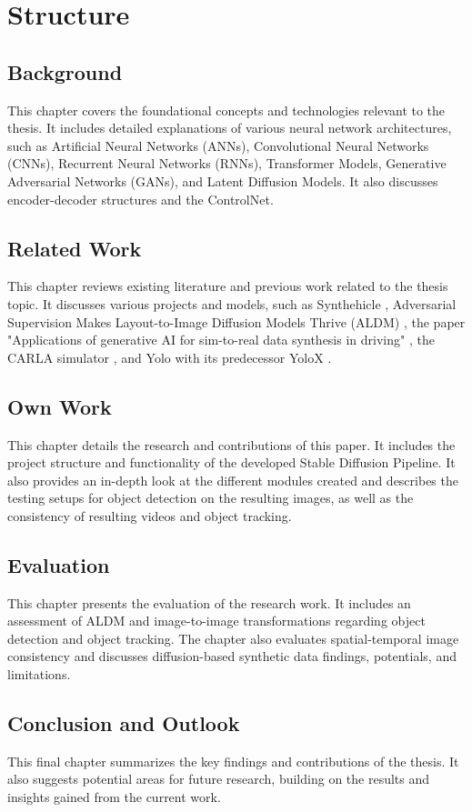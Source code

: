 \section{Structure}

\subsection{Background}
This chapter covers the foundational concepts and technologies relevant to the thesis. It includes detailed explanations of various neural network architectures, such as Artificial Neural Networks (ANNs), Convolutional Neural Networks (CNNs), Recurrent Neural Networks (RNNs), Transformer Models, Generative Adversarial Networks (GANs), and Latent Diffusion Models. It also discusses encoder-decoder structures and the ControlNet.

\subsection{Related Work}

This chapter reviews existing literature and previous work related to the thesis topic. It discusses various projects and models, such as Synthehicle \cite{Herzog_2023_WACV}, Adversarial Supervision Makes Layout-to-Image Diffusion Models Thrive (ALDM) \cite{li2024aldm}, the paper "Applications of generative AI for sim-to-real data synthesis in driving" \cite{zhao2024exploring}, the CARLA simulator \cite{dosovitskiy2017carlaopenurbandriving}, and Yolo \cite{redmon2016lookonceunifiedrealtime} with its predecessor YoloX \cite{yolox2021}.

\subsection{Own Work}
This chapter details the research and contributions of this paper. It includes the project structure and functionality of the developed Stable Diffusion Pipeline. It also provides an in-depth look at the different modules created and describes the testing setups for object detection on the resulting images, as well as the consistency of resulting videos and object tracking.

\subsection{Evaluation}
This chapter presents the evaluation of the research work. It includes an assessment of ALDM \cite{li2024aldm} and image-to-image transformations regarding object detection and object tracking. The chapter also evaluates spatial-temporal image consistency and discusses diffusion-based synthetic data findings, potentials, and limitations.

\subsection{Conclusion and Outlook}
This final chapter summarizes the key findings and contributions of the thesis. It also suggests potential areas for future research, building on the results and insights gained from the current work.
